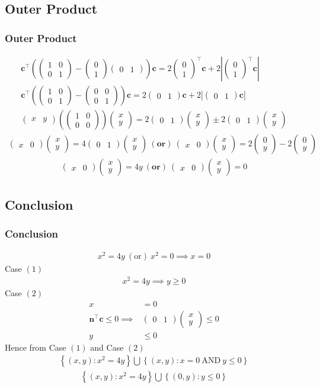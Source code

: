 \documentclass{beamer}
\providecommand{\brak}[1]{\ensuremath{\left(#1\right)}}
\providecommand{\cbrak}[1]{\ensuremath{\left\{#1\right\}}}
\theoremstyle{remark}
\newcommand{\myvec}[1]{\ensuremath{\begin{pmatrix}#1\end{pmatrix}}}
\let\vec\mathbf
\numberwithin{equation}{section}
\begin{document}
\subsection{Outer Product}
\begin{frame}
\frametitle{Outer Product}
\begin{align}
\vec{c}^\top\brak{\myvec{1&0\\0&1}-\myvec{0\\1}\myvec{0&1}}\vec{c}=2\myvec{0\\1}^\top\vec{c}+2\left|\myvec{0\\1}^\top\vec{c}\right| \\
\vec{c}^\top\brak{\myvec{1&0\\0&1}-\myvec{0&0\\0&1}}\vec{c}=2\myvec{0&1}\vec{c}+2\left|\myvec{0&1}\vec{c}\right|\\
\myvec{x&y}\brak{\myvec{1&0\\0&0}}\myvec{x\\y}=2\myvec{0&1}\myvec{x\\y}\pm2\myvec{0&1}\myvec{x\\y}
\end{align}
\begin{align}
\myvec{x&0}\myvec{x\\y}=4\myvec{0&1}\myvec{x\\y}\ \brak{\textbf{or}}\ \myvec{x&0}\myvec{x\\y}=2\myvec{0\\y}-2\myvec{0\\y}
\end{align}
\begin{align}
\myvec{x&0}\myvec{x\\y}=4y\ \brak{\textbf{or}}\ \myvec{x&0}\myvec{x\\y}=0 
\end{align}
 \end{frame}
 \subsection{Conclusion}
\begin{frame}
\frametitle{Conclusion}
\begin{align}
x^2=4y\ \brak{\text{or}}\ x^2=0 \implies x=0
\end{align}
Case \brak{1}
\begin{align}
x^2=4y \implies y\geq0
\end{align}
Case \brak{2}
\begin{align}
x&=0\\ 
\vec{n}^\top\vec{c}\leq0 \implies& \myvec{0&1}\myvec{x\\y} \leq 0\\
y&\leq0
\end{align}
Hence from Case \brak{1} and Case \brak{2}
\begin{align}
    \cbrak{\brak{x,y}:x^2=4y} \bigcup \cbrak{\brak{x,y}:x=0\ \text{AND}\ y\leq0}
\end{align}
\begin{align}
    \cbrak{\brak{x,y}:x^2=4y} \bigcup \cbrak{\brak{0,y}:y\leq0}
\end{align}
\end{frame}
\end{document}
